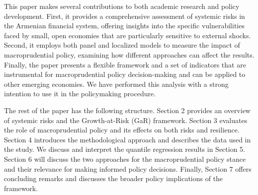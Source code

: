 This paper makes several contributions to both academic research and policy development. First, it provides a comprehensive assessment of systemic risks in the Armenian financial system, offering insights into the specific vulnerabilities faced by small, open economies that are particularly sensitive to external shocks. Second, it employs both panel and localized models to measure the impact of macroprudential policy, examining how different approaches can affect the results. Finally, the paper presents a flexible framework and a set of indicators that are instrumental for macroprudential policy decision-making and can be applied to other emerging economies. We have performed this analysis with a strong intention to use it in the policymaking procedure.

The rest of the paper has the following structure. Section 2 provides an overview of systemic risks and the Growth-at-Risk (GaR) framework. Section 3 evaluates the role of macroprudential policy and its effects on both risks and resilience. Section 4 introduces the methodological approach and describes the data used in the study. We discuss and interpret the quantile regression results in Section 5. Section 6 will discuss the two approaches for the macroprudential policy stance and their relevance for making informed policy decisions. Finally, Section 7 offers concluding remarks and discusses the broader policy implications of the framework.